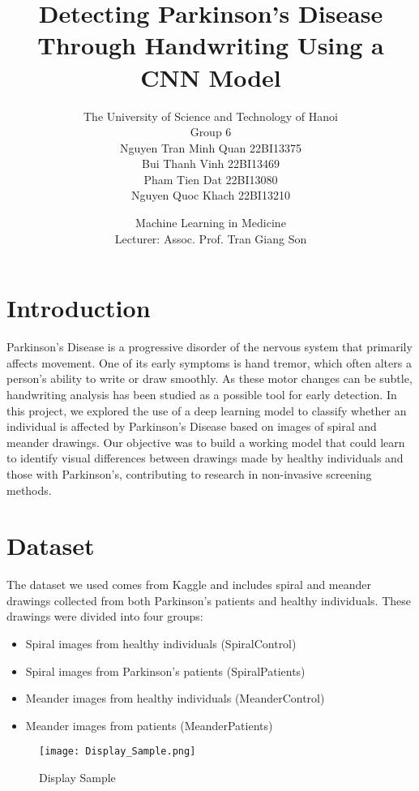 \documentclass[twocolumn]{article}
\title{Detecting Parkinson’s Disease Through Handwriting Using a CNN Model}
\author{
    The University of Science and Technology of Hanoi\\
    Group 6\\
    Nguyen Tran Minh Quan 22BI13375\\
    Bui Thanh Vinh 22BI13469\\
    Pham Tien Dat 22BI13080\\
    Nguyen Quoc Khach 22BI13210\\
}
\date{Machine Learning in Medicine\\
Lecturer: Assoc. Prof. Tran Giang Son}
\begin{document}
\maketitle


\section{Introduction}
Parkinson’s Disease is a progressive disorder of the nervous system that primarily affects movement. One of its early symptoms is hand tremor, which often alters a person’s ability to write or draw smoothly. As these motor changes can be subtle, handwriting analysis has been studied as a possible tool for early detection. In this project, we explored the use of a deep learning model to classify whether an individual is affected by Parkinson’s Disease based on images of spiral and meander drawings. Our objective was to build a working model that could learn to identify visual differences between drawings made by healthy individuals and those with Parkinson’s, contributing to research in non-invasive screening methods.

\section{Dataset}
The dataset we used comes from Kaggle and includes spiral and meander drawings collected from both Parkinson’s patients and healthy individuals. These drawings were divided into four groups:
\begin{itemize}
    \item Spiral images from healthy individuals (SpiralControl)
    \item Spiral images from Parkinson’s patients (SpiralPatients)
    \item Meander images from healthy individuals (MeanderControl)
    \item Meander images from patients (MeanderPatients)
\end{itemize}
\begin{figure}[H]
    \centering
    \texttt{[image: Display\_Sample.png]}
    \caption{Display Sample}
    \label{fig:enter-label}
\end{figure}
\end{document}
